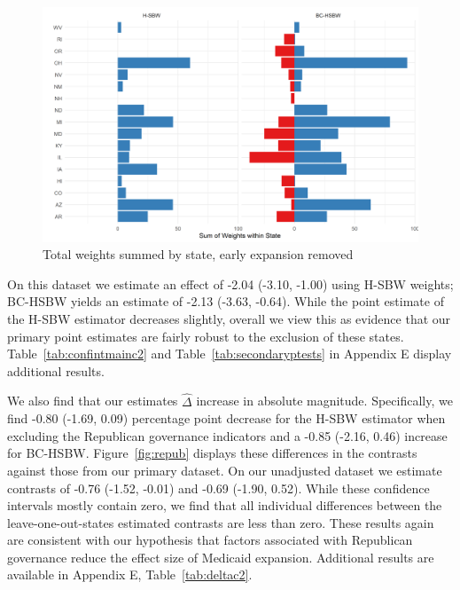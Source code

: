 \documentclass[aoas]{imsart}
\theoremstyle{plain}
\theoremstyle{remark}
\begin{document}
\begin{figure}
\begin{center}
    \caption{Total weights summed by state, early expansion removed}
    \label{fig:weightsbystatec2}
    \includegraphics[scale=0.6]{01_Plots/weights-by-state-hsbw-c2.png}
\end{center}
\end{figure}

On this dataset we estimate an effect of -2.04 (-3.10, -1.00) using H-SBW weights; BC-HSBW yields an estimate of -2.13 (-3.63, -0.64). While the point estimate of the H-SBW estimator decreases slightly, overall we view this as evidence that our primary point estimates are fairly robust to the exclusion of these states. Table~\ref{tab:confintmainc2} and Table~\ref{tab:secondaryptests} in Appendix E display additional results. 

We also find that our estimates $\hat{\Delta}$ increase in absolute magnitude. Specifically, we find -0.80 (-1.69, 0.09) percentage point decrease for the H-SBW estimator when excluding the Republican governance indicators and a -0.85 (-2.16, 0.46) increase for BC-HSBW. Figure~\ref{fig:repub} displays these differences in the contrasts against those from our primary dataset. On our unadjusted dataset we estimate contrasts of -0.76 (-1.52, -0.01) and -0.69 (-1.90, 0.52). While these confidence intervals mostly contain zero, we find that all individual differences between the leave-one-out-states estimated contrasts are less than zero. These results again are consistent with our hypothesis that factors associated with Republican governance reduce the effect size of Medicaid expansion. Additional results are available in Appendix E, Table~\ref{tab:deltac2}. 
\end{document}
